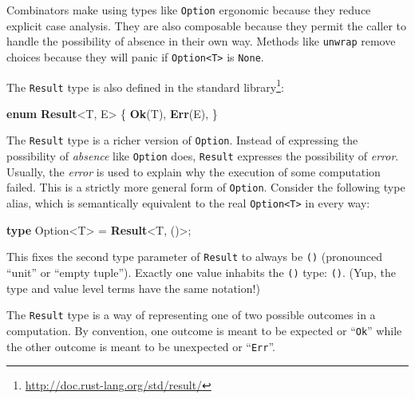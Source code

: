 \documentclass[a4paper,]{book}
\newenvironment{Shaded}{\begin{snugshade}}{\end{snugshade}}
\newcommand{\KeywordTok}[1]{\textcolor[rgb]{0.13,0.29,0.53}{\textbf{{#1}}}}
\newcommand{\NormalTok}[1]{{#1}}
\renewcommand{\href}[2]{#2\footnote{\url{#1}}}
\begin{document}
Combinators make using types like \texttt{Option} ergonomic because they
reduce explicit case analysis. They are also composable because they
permit the caller to handle the possibility of absence in their own way.
Methods like \texttt{unwrap} remove choices because they will panic if
\texttt{Option\textless{}T\textgreater{}} is \texttt{None}.


The \texttt{Result} type is also
\href{http://doc.rust-lang.org/std/result/}{defined in the standard
library}:


\begin{Shaded}
\begin{Highlighting}[]
\KeywordTok{enum} \KeywordTok{Result}\NormalTok{<T, E> \{}
    \KeywordTok{Ok}\NormalTok{(T),}
    \KeywordTok{Err}\NormalTok{(E),}
\NormalTok{\}}
\end{Highlighting}
\end{Shaded}

The \texttt{Result} type is a richer version of \texttt{Option}. Instead
of expressing the possibility of \emph{absence} like \texttt{Option}
does, \texttt{Result} expresses the possibility of \emph{error}.
Usually, the \emph{error} is used to explain why the execution of some
computation failed. This is a strictly more general form of
\texttt{Option}. Consider the following type alias, which is
semantically equivalent to the real
\texttt{Option\textless{}T\textgreater{}} in every way:

\begin{Shaded}
\begin{Highlighting}[]
\KeywordTok{type} \NormalTok{Option<T> = }\KeywordTok{Result}\NormalTok{<T, ()>;}
\end{Highlighting}
\end{Shaded}

This fixes the second type parameter of \texttt{Result} to always be
\texttt{()} (pronounced ``unit'' or ``empty tuple''). Exactly one value
inhabits the \texttt{()} type: \texttt{()}. (Yup, the type and value
level terms have the same notation!)

The \texttt{Result} type is a way of representing one of two possible
outcomes in a computation. By convention, one outcome is meant to be
expected or ``\texttt{Ok}'' while the other outcome is meant to be
unexpected or ``\texttt{Err}''.
\end{document}

